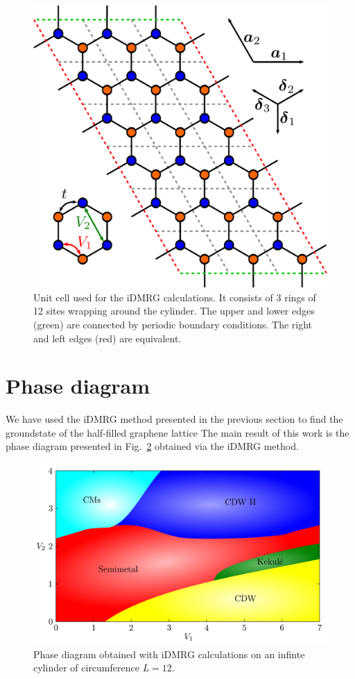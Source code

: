 \documentclass[aps,prx,10pt,twocolumn,floatfix,superscriptaddress,showpacs,numerical,footinbib]{revtex4-1}
\begin{document}
\begin{figure}
 \includegraphics[width=\columnwidth]{pdf/unit_cell.pdf}
 \caption{Unit cell used for the iDMRG calculations. It consists of 3 rings of 12 sites wrapping around the cylinder. The upper and lower edges (green) are connected by periodic boundary conditions. The right and left edges (red) are equivalent. \label{fig:Defs}}
\end{figure}
%
\section{Phase diagram}
%
We have used the iDMRG method presented in the previous section
to find the groundstate of the half-filled graphene lattice 
The main result of this work is the phase diagram presented in Fig.~\ref{fig:phase diagram} obtained
via the iDMRG method.

\begin{figure}
 \includegraphics[width=\columnwidth]{pdf/phase_diagram.pdf}
 \caption{Phase diagram obtained with iDMRG calculations on an infinte cylinder of circumference $L=12$. \label{fig:phase diagram}}
\end{figure}
\end{document}
